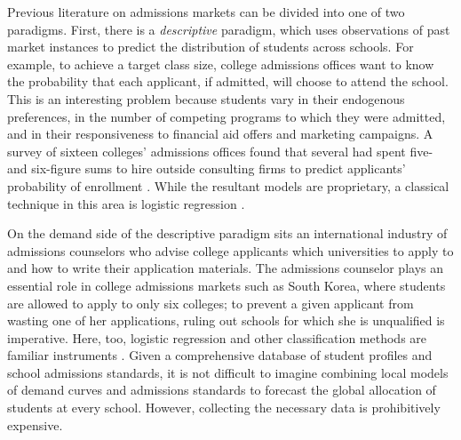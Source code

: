 \documentclass[12pt]{article}
\numberwithin{equation}{subsection}
\theoremstyle{definition}
\begin{document}
Previous literature on admissions markets can be divided into one of two paradigms. First, there is a \emph{descriptive} paradigm, which uses observations of past market instances to predict the distribution of students across schools. For example, to achieve a target class size, college admissions offices want to know the probability that each applicant, if admitted, will choose to attend the school. This is an interesting problem because students vary in their endogenous preferences, in the number of competing programs to which they were admitted, and in their responsiveness to financial aid offers and marketing campaigns. A survey of sixteen colleges' admissions offices found that several had spent five- and six-figure sums to hire outside consulting firms to predict applicants' probability of enrollment \parencite[][]{estimatingapplications}. While the resultant models are proprietary, a classical technique in this area is logistic regression \parencite[][]{understandingandpredictingtheyield}.
 
On the demand side of the descriptive paradigm sits an international industry of admissions counselors who advise college applicants which universities to apply to and how to write their application materials. The admissions counselor plays an essential role in college admissions markets such as South Korea, where students are allowed to apply to only six colleges; to prevent a given applicant from wasting one of her applications, ruling out schools for which she is unqualified is imperative. Here, too, logistic regression and other classification methods are familiar instruments \parencite[][]{asimulationapproachtopredictingcollegeadmissions}. Given a comprehensive database of student profiles and school admissions standards, it is not difficult to imagine combining local models of demand curves and admissions standards to forecast the global allocation of students at every school. However, collecting the necessary data is prohibitively expensive. %
\end{document}
